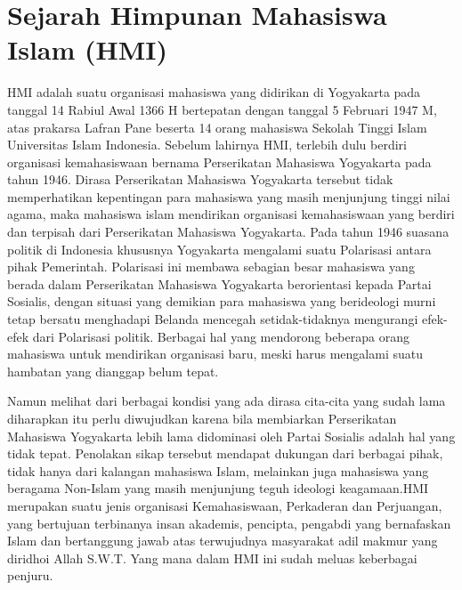 \documentclass{jtetiproposalskripsi}
\begin{document}
\section{Sejarah Himpunan Mahasiswa Islam (HMI)}
HMI adalah suatu organisasi mahasiswa yang didirikan di Yogyakarta pada tanggal 14 Rabiul Awal 1366 H bertepatan dengan tanggal 5 Februari 1947 M, atas prakarsa Lafran Pane beserta 14 orang mahasiswa Sekolah Tinggi Islam Universitas Islam Indonesia. Sebelum lahirnya HMI, terlebih dulu berdiri organisasi kemahasiswaan bernama Perserikatan Mahasiswa Yogyakarta pada tahun 1946. Dirasa Perserikatan Mahasiswa Yogyakarta tersebut tidak memperhatikan kepentingan para mahasiswa yang masih menjunjung tinggi nilai agama, maka mahasiswa islam mendirikan organisasi kemahasiswaan yang berdiri dan terpisah dari Perserikatan Mahasiswa Yogyakarta. Pada tahun 1946 suasana politik di Indonesia khususnya Yogyakarta  mengalami suatu Polarisasi antara pihak Pemerintah. Polarisasi ini membawa sebagian besar mahasiswa yang berada dalam Perserikatan Mahasiswa Yogyakarta berorientasi kepada Partai Sosialis, dengan situasi yang demikian para mahasiswa yang berideologi murni tetap bersatu menghadapi Belanda mencegah setidak-tidaknya mengurangi efek-efek dari Polarisasi politik. Berbagai hal yang mendorong beberapa orang mahasiswa untuk mendirikan organisasi baru, meski harus mengalami suatu hambatan yang dianggap belum tepat. 

Namun melihat dari berbagai kondisi yang ada dirasa cita-cita yang sudah lama diharapkan itu perlu diwujudkan karena bila membiarkan Perserikatan Mahasiswa Yogyakarta lebih lama didominasi oleh Partai Sosialis adalah hal yang tidak tepat. Penolakan sikap tersebut mendapat dukungan dari berbagai pihak, tidak hanya dari kalangan mahasiswa Islam, melainkan juga mahasiswa yang beragama Non-Islam yang masih menjunjung teguh ideologi keagamaan.HMI merupakan suatu jenis organisasi Kemahasiswaan, Perkaderan dan Perjuangan, yang bertujuan terbinanya insan akademis, pencipta, pengabdi yang bernafaskan Islam dan bertanggung jawab atas terwujudnya masyarakat adil makmur yang diridhoi Allah S.W.T. Yang mana dalam HMI ini sudah meluas keberbagai penjuru.

\newpage
\end{document}
